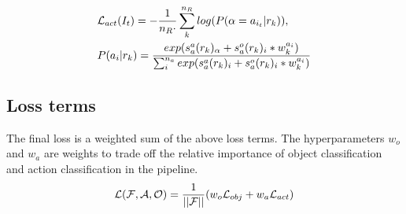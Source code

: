 \begin{align}
\label{eqn:act_cls_loss}
&{\mathcal L}_{act} (I_t) = -\frac{1}{n_R\cdot}\sum_{k}^{n_R} log(P(\alpha=a_{i_t}|r_k)), \nonumber\\
&P(a_i|r_k) = \frac{exp(s_a^a(r_k)_{\alpha}+s_a^o(r_k)_i*w_k^{a_i})}{\sum_{i}^{n_a}exp(s_a^a(r_k)_{i}+s_a^o(r_k)_{i}*w_k^{a_i})}
\end{align}

\subsection{Loss terms}
The final loss is a weighted sum of the above loss terms. The hyperparameters $w_o$ and $w_a$ are weights to trade off the relative importance of object classification and action classification in the pipeline.
\begin{align}
\label{eqn:final_loss_term}
{\mathcal L}({\mathcal F}, {\mathcal A}, {\mathcal O}) = \frac{1}{||{\mathcal F}||}(w_o{\mathcal L}_{obj}+w_a{\mathcal L}_{act})
\end{align}

